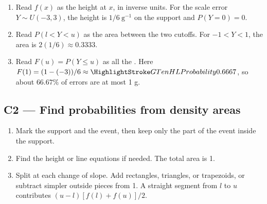 \begin{enumerate}
  \item Read \(f(x)\) as the height at \(x\), in inverse units. For the scale error \(Y\sim U(-3,3)\), the height is \(1/6\ \mathrm{g}^{-1}\) on the support and \(P(Y=0)=0\).
  \item Read \(P(l<Y<u)\) as the area between the two cutoffs. For \(-1<Y<1\), the area is \(2(1/6)\approx0.3333\).
  \item Read \(F(u)=P(Y\le u)\) as all the . Here \(F(1)=(1-(-3))/6\approx\OutlineEvent{0.6667}\), so about \(66.67\%\) of errors are at most 1 g. 
\end{enumerate}
\par\nobreak
{}

\clearpage
\subsection{C2 --- Find probabilities from density areas}\label{crit:c2}
\begin{enumerate}
  \item Mark the support and the event, then keep only the part of the event inside the support.
  \item Find the height or line equations if needed. The total area is 1.
  \item Split at each change of slope. Add rectangles, triangles, or trapezoids, or subtract simpler outside pieces from 1. A straight segment from \(l\) to \(u\) contributes \((u-l)[f(l)+f(u)]/2\).
\end{enumerate}


